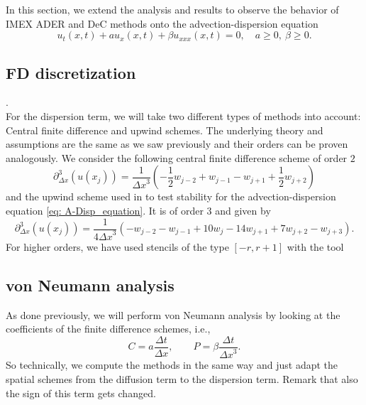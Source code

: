 In this section, we extend the analysis and results to observe the behavior of IMEX ADER and DeC methods onto the advection-dispersion equation
\begin{equation}
\label{eq: A-Disp_equation}
u_t(x,t) + au_x(x,t) + \beta u_{xxx}(x,t) = 0, \quad a\ge0, \ \beta \ge 0.
\end{equation}
\subsection{FD discretization}
\label{sec: disp_spatial_discretization}
.\\
For the dispersion term, we will take two different types of methods into account: Central finite difference and upwind schemes. The underlying theory and assumptions are the same as we saw previously and their orders can be proven analogously. We consider the following central finite difference scheme of order $2$ 
\begin{equation}
	\label{eq: CFD-schemes_third_deriv}
	\partial_{\Delta x}^3(u(x_j)) = \frac{1}{{\Delta x}^3}\left(-\frac{1}{2}w_{j-2} + w_{j-1} - w_{j+1} + \frac{1}{2}w_{j+2}\right)
\end{equation}
and the upwind scheme used in \cite{TanChenShu_ImEx_Stability} to test stability for the advection-dispersion equation \eqref{eq: A-Disp_equation}. It is of order 3 and given by
\begin{equation}
\label{eq: shu_upwind_dispersion}
\partial_{\Delta x}^3(u(x_j)) =\frac{1}{4{\Delta x}^3}\left( -w_{j-2} - w_{j-1}  + 10w_{j} - 14w_{j+1} + 7w_{j+2} - w_{j+3}\right).
\end{equation}
For higher orders, we have used stencils of the type $[-r,r+1]$ with the tool 
\subsection{von Neumann analysis}
As done previously, we will perform von Neumann analysis by looking at the coefficients of the finite difference schemes, i.e.,
$$C=a\frac{\Delta t}{\Delta x},\qquad P= \beta\frac{\Delta t}{{\Delta x}^3}.$$
So technically, we compute the methods in the same way and just adapt the spatial schemes from the diffusion term to the dispersion term. Remark that also the sign of this term gets changed. 

